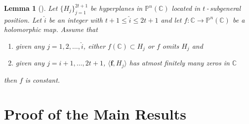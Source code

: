 \documentclass[11pt, reqno]{amsart}
\newtheorem{lemma}[theorem]{Lemma}
\theoremstyle{definition}
\theoremstyle{remark}
\numberwithin{equation}{section}
\begin{document}
\begin{lemma}[{\cite[Lemma 3.8]{liu-ofommitcps-2016}}] \label{L-Liu_hyperplanes_subgeneral_position_some_omit_some_intersect_finitely_implies_constant} 
Let $\{H_{j}\}_{j=1}^{2t+1}$ be hyperplanes in $\mathbb{P}^n(\mathbb{C})$ located in $t$\,-\,subgeneral 
position. Let $\hat{i}$ be an integer with $t+1 \leq \hat{i} \leq 2t+1$ and let $f : \mathbb{C} \to \mathbb{P}^n(\mathbb{C})$ be a 
holomorphic map. Assume that
\begin{enumerate}
\item given any $j=1,2,\dots,\hat{i}$, either $f(\mathbb{C}) \subset H_j$ or $f$ omits $H_j$ and
\item given any $j=\hat{i}+1,\dots,2t+1$, $\langle \mathbf f,H_j\rangle$ has atmost finitely many zeros in $\mathbb{C}$
\end{enumerate}
then $f$ is constant.
\end{lemma}
\section{Proof of the Main Results}
\end{document}
